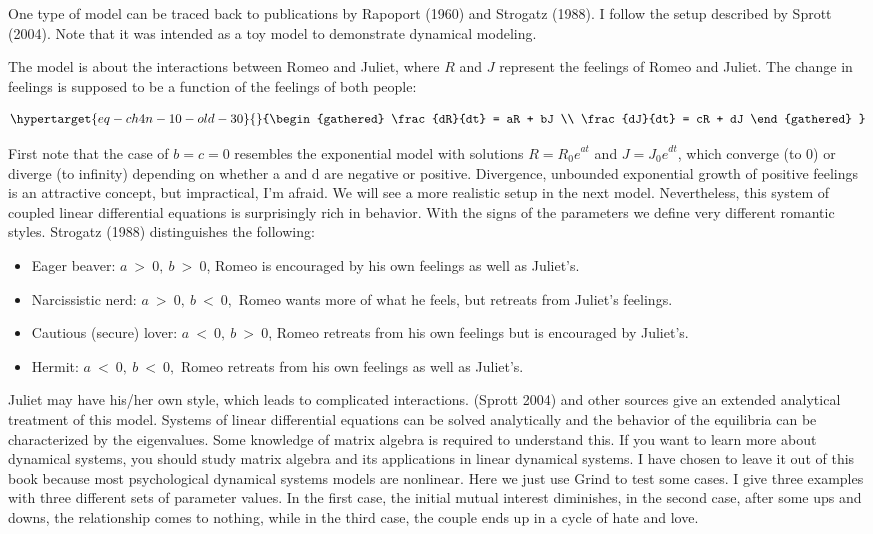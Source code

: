 \documentclass[
  a4paper,
  DIV=11,
  numbers=noendperiod,
  oneside]{scrreprt}
\begin{document}
One type of model can be traced back to publications by Rapoport (1960)
and Strogatz (1988). I follow the setup described by Sprott (2004). Note
that it was intended as a toy model to demonstrate dynamical modeling.

The model is about the interactions between Romeo and Juliet, where
\(R\) and \(J\) represent the feelings of Romeo and Juliet. The change
in feelings is supposed to be a function of the feelings of both people:

\begin{equation}\protect\hypertarget{eq-ch4n-10-old-30}{}{\begin{gathered}
\frac{dR}{dt} = aR + bJ \\
\frac{dJ}{dt} = cR + dJ
\end{gathered}
}\label{eq-ch4n-10-old-30}\end{equation}

First note that the case of \(b = c = 0\) resembles the exponential
model with solutions \(R = {R_{0}e}^{at}\) and \(J = {J_{0}e}^{dt}\),
which converge (to 0) or diverge (to infinity) depending on whether a
and d are negative or positive. Divergence, unbounded exponential growth
of positive feelings is an attractive concept, but impractical, I'm
afraid. We will see a more realistic setup in the next model.
Nevertheless, this system of coupled linear differential equations is
surprisingly rich in behavior. With the signs of the parameters we
define very different romantic styles. Strogatz (1988) distinguishes the
following:

\begin{itemize}
\item
  Eager beaver: \(a\  > \ 0,\ b\  > \ 0\), Romeo is encouraged by his
  own feelings as well as Juliet's.
\item
  Narcissistic nerd: \(a\  > \ 0,\ b\  < \ 0,\) Romeo wants more of what
  he feels, but retreats from Juliet's feelings.
\item
  Cautious (secure) lover: \(a\  < \ 0,\ b\  > \ 0\), Romeo retreats
  from his own feelings but is encouraged by Juliet's.
\item
  Hermit: \(a\  < \ 0,\ b\  < \ 0,\) Romeo retreats from his own
  feelings as well as Juliet's.
\end{itemize}

Juliet may have his/her own style, which leads to complicated
interactions. (Sprott 2004) and other sources give an extended
analytical treatment of this model. Systems of linear differential
equations can be solved analytically and the behavior of the equilibria
can be characterized by the eigenvalues. Some knowledge of matrix
algebra is required to understand this. If you want to learn more about
dynamical systems, you should study matrix algebra and its applications
in linear dynamical systems. I have chosen to leave it out of this book
because most psychological dynamical systems models are nonlinear. Here
we just use Grind to test some cases. I give three examples with three
different sets of parameter values. In the first case, the initial
mutual interest diminishes, in the second case, after some ups and
downs, the relationship comes to nothing, while in the third case, the
couple ends up in a cycle of hate and love.
\end{document}
